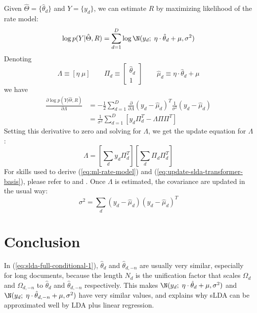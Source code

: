 Given $\hat\Theta=\{\hat\theta_d\}$ and $Y=\{y_d\}$, we can estimate
$R$ by maximizing likelihood of the rate model:
\begin{equation}
  \label{eq:rate-model}
  \log p(Y | \hat\Theta, R) =
  \sum_{d=1}^D \log \N(y_d; \; \eta \cdot \hat\theta_d + \mu, \sigma^2)
\end{equation}
Denoting
\begin{equation}
 \Lambda\equiv[\eta\;\mu] \qquad
 \Pi_d\equiv\begin{bmatrix}\hat\theta_d\\1\end{bmatrix} \qquad
 \hat\mu_d \equiv \eta \cdot \hat\theta_d + \mu
\end{equation}
we have
\begin{equation}
  \label{eq:ml-rate-model}
  \begin{split}
  \frac{\partial{\log p(Y | \hat\Theta, R)}}{\partial \Lambda}
  &=
  -\frac{1}{2}
  \sum_{d=1}^D
  \frac{\partial}{\partial \Lambda}
  \left(y_d - \hat\mu_d\right)^T \frac{1}{\sigma^2} \left(y_d - \hat\mu_d\right)
  \\
  &= \frac{1}{\sigma^2} \sum_{d=1}^D \left[ y_d \Pi_d^T - \Lambda\Pi\Pi^T \right]
  \end{split}
\end{equation}
Setting this derivative to zero and solving for $\Lambda$, we get the
update equation for $\Lambda$:
\begin{equation}
  \label{eq:update-slda-transformer-basis}
  \Lambda = \left[\sum_d y_d\Pi_d^T\right] \left[\sum_d \Pi_d\Pi_d^T\right]
\end{equation}
For skills used to derive (\ref{eq:ml-rate-model}) and
(\ref{eq:update-slda-transformer-basis}), please refer to \cite{phmm}
and \cite{psomn}.  Once $\Lambda$ is estimated, the covariance are
updated in the usual way:
\begin{equation}
  \label{eq:update-slda-covariance}
  \sigma^2 = \sum_d (y_d-\hat\mu_d)(y_d-\hat\mu_d)^T
\end{equation}

\section{Conclusion}


In (\ref{eq:slda-full-conditional-1}), $\hat{\theta}_d$ and
$\hat{\theta}_{d,-n}$ are usually very similar, especially for long
documents, because the length $N_d$ is the unification factor that
scales $\Omega_d$ and $\Omega_{d,-n}$ to $\hat{\theta}_d$ and
$\hat{\theta}_{d,-n}$ respectively.  This makes
$\N(y_d;\;\eta\cdot\hat{\theta}_d+\mu,\sigma^2)$ and
$\N(y_d;\;\eta\cdot\hat{\theta}_{d,-n}+\mu,\sigma^2)$ have very
similar values, and explains why sLDA can be approximated well by LDA
plus linear regression.


